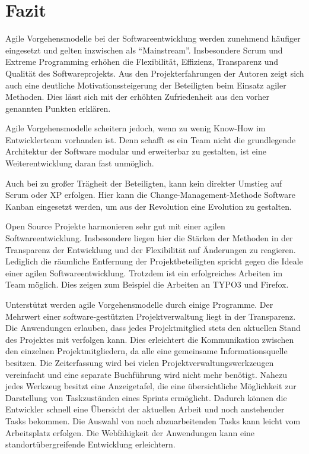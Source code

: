 \section{Fazit}
Agile Vorgehensmodelle bei der Softwareentwicklung werden zunehmend häufiger eingesetzt und gelten inzwischen als ``Mainstream''. \cite{bib:ane} Insbesondere Scrum und Extreme Programming erhöhen die Flexibilität, Effizienz, Transparenz und Qua\-li\-tät des Softwareprojekts. Aus den Projekterfahrungen der Autoren zeigt sich auch eine deutliche Motivationssteigerung der Beteiligten beim Einsatz agiler Methoden. Dies lässt sich mit der erhöhten Zufriedenheit aus den vorher ge\-nann\-ten Punkten erklären.

Agile Vorgehensmodelle scheitern jedoch, wenn zu wenig Know-How im Entwicklerteam vorhanden ist. Denn schafft es ein Team nicht die grundlegende Architektur der Software modular und erweiterbar zu gestalten, ist eine Weiterentwicklung daran fast unmöglich.

Auch bei zu großer Trägheit der Beteiligten, kann kein direkter Umstieg auf Scrum oder XP erfolgen. Hier kann die Change-Management-Methode Software Kanban eingesetzt werden, um aus der Revolution eine Evolution zu gestalten.

Open Source Projekte harmonieren sehr gut mit einer agilen Softwareentwicklung. Insbesondere liegen hier die Stärken der Methoden in der Transparenz der Entwicklung und der Flexibilität auf Änderungen zu reagieren. Lediglich die räumliche Entfernung der Projektbeteiligten spricht gegen die Ideale einer agilen Softwareentwicklung. Trotzdem ist ein erfolgreiches Arbeiten im Team möglich. Dies zeigen zum Beispiel die Arbeiten an TYPO3 und Firefox. 

Unterstützt werden agile Vorgehensmodelle durch einige Programme. Der Mehrwert einer software-gestützten Projektverwaltung liegt in der Transparenz. Die Anwendungen erlauben, dass jedes Projektmitglied stets den aktuellen Stand des Projektes mit verfolgen kann. Dies erleichtert die Kommunikation zwischen den einzelnen Projektmitgliedern, da alle eine gemeinsame Infor\-mations\-quelle besitzen. Die Zeiterfassung wird bei vielen Projektverwaltungswerkzeugen vereinfacht und eine separate Buchführung wird nicht mehr benötigt. Nahezu jedes Werkzeug besitzt eine Anzeigetafel, die eine übersichtliche Möglichkeit zur Darstellung von Taskzuständen eines Sprints ermöglicht. Dadurch können die Entwickler schnell eine Übersicht der aktuellen Arbeit und noch anstehender Tasks bekommen. Die Auswahl von noch abzuarbeitenden Tasks kann leicht vom Arbeitsplatz erfolgen. Die Webfähigkeit der Anwendungen kann eine standortübergreifende Entwicklung erleichtern.

